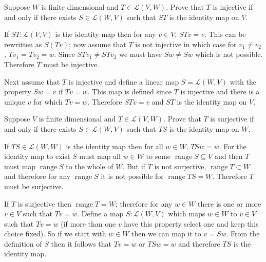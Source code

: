 \documentclass[11pt,a4paper]{scrartcl}
\DeclareMathOperator{\range}{range}
\newcommand{\lmap}[2]{\mathcal{L}(#1,#2)}
\newcounter{problem}
\begin{document}
\begin{problem}[3.B.20]
    {
        Suppose $W$ is finite dimensional and $T \in  \lmap{V}{W}$. Prove that $T$ is injective 
        if and only if there exists $S \in \lmap{W}{V}$ such that $ST$ is the identity map on $V$.
    }
    {
        If $ST:\lmap{V}{V}$ is the identity map then for any $v\in V$, $STv=v$. 
        This can be rewritten as $S(Tv)$; now assume that $T$ is not injective in which case for $v_1\neq v_2$, 
        $Tv_1=Tv_2=w$. Since $STv_1 \neq STv_2$ we must have
        $Sw \neq Sw$ which is not possible. Therefore $T$ must be injective. 
        
        Next assume that $T$ is injective and define a linear map $S=\lmap{W}{V}$ with the property 
        $Sw=v$ if $Tv=w$. This map is defined since $T$ is injective and there is a unique $v$ for which $Tv=w$. Therefore 
        $STv=v$ and $ST$ is the identity map on $V$. 
    }
\end{problem}

\begin{problem}[3.B.21]
{
    Suppose $V$ is finite dimensional and $T \in  \lmap{V}{W}$. Prove that $T$ is surjective if and only if there 
    exists $S \in \lmap{W}{V}$ such that $TS$ is the identity map on $W$.
}
{
If $TS \in \lmap{W}{W}$ is the identity map then for all $w \in W$, $TSw=w$. For the identity map to exist $S$ must map all $w\in W$ to some $\range{S}\subseteq V$ and then $T$ must map
$\range S$ to the whole of $W$. But if $T$ is not surjective,
$\range{T}\subset W$ and therefore for any $\range{S}$ it is not possible for $\range{TS}=W$. Therefore $T$ must be surjective.

If $T$ is surjective then $\range{T}=W$; therefore
for any $w\in W$ there is one or more $v\in V$ such that $Tv=w$. Define a map $S:\lmap{W}{V}$ which maps $w\in W$ to
$v\in V$ such that $Tv=w$ (if more than one $v$ have this property select one and keep this choice fixed). So if we start with $w\in W$ then we can map it to $v=Sw$. From the definition of $S$ then it follows that $Tv=w$ or $TSw=w$ and therefore $TS$ is the identity map. 
}
\end{problem}

\newpage
\end{document}

